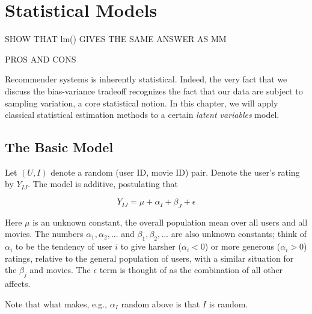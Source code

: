 \chapter{Statistical Models}  
\label{chap:mixed} 


SHOW THAT lm() GIVES THE SAME ANSWER AS MM

PROS AND CONS

Recommender systems is inherently statistical.  Indeed, the very fact
that we discuss the bias-variance tradeoff recognizes the fact that our
data are subject to sampling variation, a core statistical notion.  In
this chapter, we will apply classical statistical estimation methods to
a certain \textit{latent variables} model.

\section{The Basic Model}

Let $(U,I)$ denote a random (user ID, movie ID) pair.  Denote the user's
rating by $Y_{IJ}$.  The model is additive, postulating that

\begin{equation}
Y_{IJ} = \mu + \alpha_I + \beta_J + \epsilon
\end{equation}

Here $\mu$ is an unknown constant, the overall population mean over all
users and all movies.  The numbers $\alpha_1, \alpha_2,...$ and
$\beta_1, \beta_2,...$ are also unknown constants; think of $\alpha_i$
to be the tendency of user $i$ to give harsher ($\alpha_i < 0$) or more
generous ($\alpha_i > 0$) ratings, relative to the general population of
users, with a similar situation for the $\beta_j$ and movies.  The
$\epsilon$ term is thought of as the combination of all other affects.

Note that what makes, e.g., $\alpha_I$ random above is that $I$ is
random.

